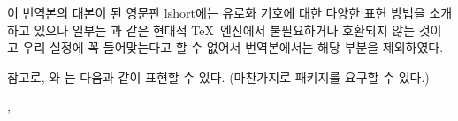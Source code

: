 이 번역본의 대본이 된 영문판 lshort에는 유로화 기호에 대한 다양한 표현 방법을 소개하고 있으나 
일부는 \XeLaTeX 과 같은 현대적 \TeX\ 엔진에서 불필요하거나 호환되지 않는 것이고 우리 실정에
꼭 들어맞는다고 할 수 없어서 번역본에서는 해당 부분을 제외하였다.

참고로, 와 는 다음과 같이 표현할 수 있다.
(마찬가지로  패키지를 요구할 수 있다.)
\begin{example}
  \textwon, \textyen
\end{example}






